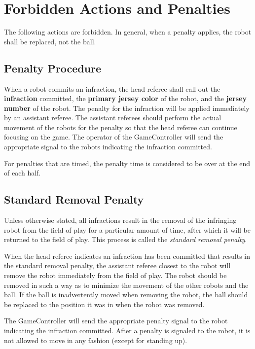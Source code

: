 \section{Forbidden Actions and Penalties}
\label{sec:forbidden_act}

The following actions are forbidden.
In general, when a penalty applies, the robot shall be replaced, not the ball.

\subsection{Penalty Procedure}
\label{sec:penalty_procedure}

When a robot commits an infraction, the head referee shall call out the \textbf{infraction} committed, the \textbf{primary jersey color} of the robot, and the \textbf{jersey number} of the robot.
The penalty for the infraction will be applied immediately by an assistant referee.
The assistant referees should perform the actual movement of the robots for the penalty so that the head referee can continue focusing on the game.
The operator of the GameController will send the appropriate signal to the robots indicating the infraction committed.

For penalties that are timed, the penalty time is considered to be over at the end of each half.

\subsection{Standard Removal Penalty}
\label{sec:removal_penalty}

Unless otherwise stated, all infractions result in the removal of the infringing robot from the field of play for a particular amount of time, after which it will be returned to the field of play.
This process is called the \textit{standard removal penalty}.

When the head referee indicates an infraction has been committed that results in the standard removal penalty, the assistant referee closest to the robot will remove the robot immediately from the field of play.
The robot should be removed in such a way as to minimize the movement of the other robots and the ball.
If the ball is inadvertently moved when removing the robot, the ball should be replaced to the position it was in when the robot was removed.

The GameController will send the appropriate penalty signal to the robot indicating the infraction committed.
After a penalty is signaled to the robot, it is not allowed to move in any fashion (except for standing up).


